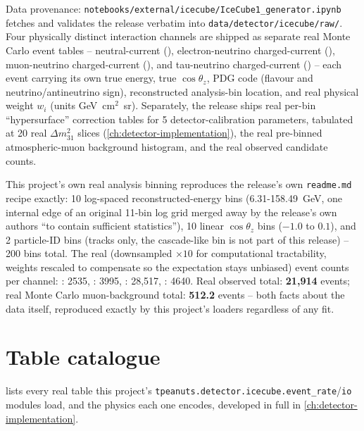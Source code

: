 \begin{theorybox}
Data provenance: \texttt{notebooks/external/icecube/IceCube1\_generator.ipynb}
fetches and validates the release verbatim into
\texttt{data/detector/icecube/raw/}. Four physically distinct interaction
channels are shipped as separate real Monte Carlo event tables --
neutral-current (), electron-neutrino charged-current
(), muon-neutrino charged-current (), and
tau-neutrino charged-current () -- each event carrying its
own true energy, true $\cos\theta_z$, PDG code (flavour and
neutrino/antineutrino sign), reconstructed analysis-bin location, and real
physical weight $w_i$ (units GeV~cm$^2$~sr). Separately, the release ships
real per-bin ``hypersurface'' correction tables for 5 detector-calibration
parameters, tabulated at 20 real $\Delta m^2_{31}$ slices
(\cref{ch:detector-implementation}), the real pre-binned atmospheric-muon
background histogram, and the real observed candidate counts.
\end{theorybox}

\begin{resultbox}
This project's own real analysis binning reproduces the release's own
\texttt{readme.md} recipe exactly: 10 log-spaced reconstructed-energy bins
(6.31-158.49~GeV, one internal edge of an original 11-bin log grid merged
away by the release's own authors ``to contain sufficient statistics''),
10 linear $\cos\theta_z$ bins ($-1.0$ to $0.1$), and 2 particle-ID bins
(tracks only, the cascade-like bin is not part of this release) -- 200
bins total. The real (downsampled $\times10$ for computational
tractability, weights rescaled to compensate so the expectation stays
unbiased) event counts per channel: : 2535, : 3995,
: 28{,}517, : 4640. Real observed total:
\textbf{21{,}914} events; real Monte Carlo muon-background total:
\textbf{512.2} events -- both facts about the data itself, reproduced
exactly by this project's loaders regardless of any fit.
\end{resultbox}

\section{Table catalogue}

 lists every real table this project's
\texttt{tpeanuts.detector.icecube.event\_rate}/\texttt{io} modules load,
and the physics each one encodes, developed in full in
\cref{ch:detector-implementation}.

